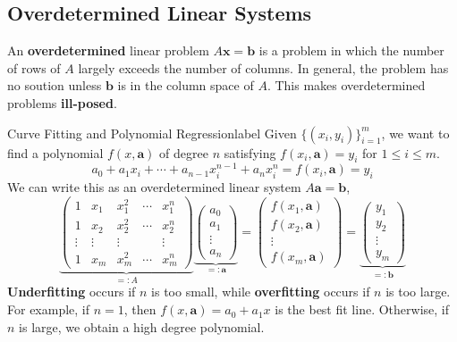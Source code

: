 \subsection{Overdetermined Linear Systems}
An \textbf{overdetermined} linear problem $A \mathbf{x} = \mathbf{b}$ is a problem in which the number of rows of $A$ largely exceeds the number of columns. In general, the problem has no soution unless $\mathbf{b}$ is in the column space of $A$. This makes overdetermined problems \textbf{ill-posed}.

\begin{ex}{Curve Fitting and Polynomial Regression}{label}
	Given $\{(x_i, y_i)\}_{i = 1}^m$, we want to find a polynomial $f(x, \mathbf{a})$ of degree $n$ satisfying $f(x_i, \mathbf{a}) = y_i$ for $1 \leq i \leq m$.
	\[a_0+a_1 x_i+\cdots+a_{n-1} x_i^{n-1}+a_n x_i^n=f\left(x_i, \boldsymbol{a}\right)=y_i\]
	We can write this as an overdetermined linear system $A \mathbf{a} = \mathbf{b}$,
	\[\underbrace{\left(\begin{array}{ccccc}1 & x_1 & x_1^2 & \cdots & x_1^n \\ 1 & x_2 & x_2^2 & \cdots & x_2^n \\ \vdots & \vdots & \vdots & & \vdots \\ 1 & x_m & x_m^2 & \cdots & x_m^n\end{array}\right)}_{=: A} \underbrace{\left(\begin{array}{c}a_0 \\ a_1 \\ \vdots \\ a_n\end{array}\right)}_{=: \boldsymbol{a}}=\left(\begin{array}{c}f\left(x_1, \boldsymbol{a}\right) \\ f\left(x_2, \boldsymbol{a}\right) \\ \vdots \\ f\left(x_m, \boldsymbol{a}\right)\end{array}\right)=\underbrace{\left(\begin{array}{c}y_1 \\ y_2 \\ \vdots \\ y_m\end{array}\right)}_{=: \boldsymbol{b}}\]
	\textbf{Underfitting} occurs if $n$ is too small, while \textbf{overfitting} occurs if $n$ is too large. For example, if $n = 1$, then $f(x, \mathbf{a}) = a_0 + a_1 x$ is the best fit line. Otherwise, if $n$ is large, we obtain a high degree polynomial.
\end{ex}

